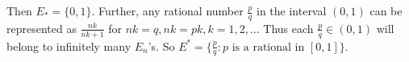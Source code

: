 \documentclass[preview]{standalone}
\begin{document}
\begin{center}
Then $E_*=\{0,1\}$. Further, any rational number $\frac{p}{q}$ in the interval $(0,1)$ can be represented as $\frac{nk}{nk+1}$ for $nk=q, nk=pk, k=1,2,\dots$ Thus each $\frac{p}{q}\in (0,1)$ will belong to infinitely many $E_n$'s. So $E^* = \{\frac{p}{q} : p \text{ is a rational in } [0,1] \}$.
\end{center}
\end{document}
